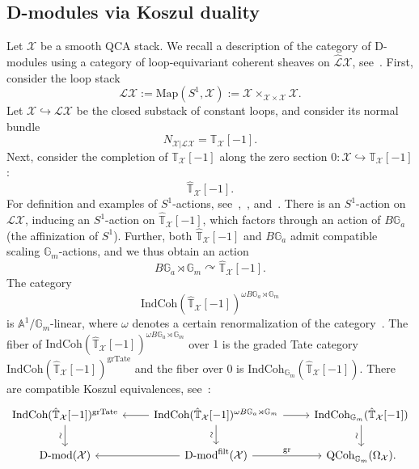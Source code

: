 \documentclass [11pt,oneside,a4paper,mathscr]{amsart}
\theoremstyle{definition}
\newcommand{\X}{\mathcal{X}}
\begin{document}
 
\subsection{D-modules via Koszul duality}

Let $\X$ be a smooth QCA stack. We recall a description of the category of D-modules using a category of loop-equivariant coherent sheaves on $\hat{\mathscr{L}}\X$, see~\cite[Theorem A]{HChen}. 
First, consider the loop stack \[\mathscr{L}\X:=\text{Map}(S^1,\X):=\X\times_{\X\times\X}\X.\]
Let $\X\hookrightarrow\mathscr{L}\X$ be the closed substack of constant loops, and consider its normal bundle
\[N_{\X|\mathscr{L}\X}=\mathbb{T}_{\X}[-1].\]
Next, consider the completion of $\mathbb{T}_\X[-1]$ along the zero section $0\colon \X\hookrightarrow \mathbb{T}_\X[-1]$: \[\hat{\mathbb{T}}_\X[-1].\] 
For definition and examples of $S^1$-actions, see~\cite{Preygel},~\cite{HChen}, and~\cite[Appendix A]{BZCHN}.
There is an $S^1$-action on $\mathscr{L}\X$, inducing an $S^1$-action on $\hat{\mathbb{T}}_\X[-1]$, which factors through an action of $B\mathbb{G}_a$ (the affinization of $S^1$). 
Further, both $\hat{\mathbb{T}}_\X[-1]$ and $B\mathbb{G}_a$ admit compatible scaling $\mathbb{G}_m$-actions, and we thus obtain an action  
\[B\mathbb{G}_a\rtimes \mathbb{G}_m \curvearrowright \hat{\mathbb{T}}_\X[-1].\] 
The category \[\text{IndCoh}(\hat{\mathbb{T}}_\X[-1])^{\omega B\mathbb{G}_a\rtimes\mathbb{G}_m}\] is $\mathbb{A}^1/\mathbb{G}_m$-linear, where $\omega$ denotes a certain renormalization of the category~\cite[Subsection 3.1.8]{HChen}. The fiber of $\text{IndCoh}(\hat{\mathbb{T}}_\X[-1])^{\omega B\mathbb{G}_a\rtimes\mathbb{G}_m}$ over $1$ is the graded Tate category $\text{IndCoh}(\hat{\mathbb{T}}_\X[-1])^{\text{grTate}}$ and the fiber over $0$ is $\text{IndCoh}_{\mathbb{G}_m}(\hat{\mathbb{T}}_\X[-1])$.
There are compatible Koszul equivalences, see~\cite[Theorem A]{HChen}:
\begin{equation*}
    \begin{tikzcd}
        \text{IndCoh}(\hat{\mathbb{T}}_\X[-1])^{\text{grTate}} 
        \arrow[d, "\sim" {anchor=south, rotate=90}]& 
        \text{IndCoh}(\hat{\mathbb{T}}_\X[-1])^{\omega B\mathbb{G}_a\rtimes\mathbb{G}_m} 
        \arrow[r]\arrow[l]\arrow[d, "\sim" {anchor=south, rotate=90}]& 
        \text{IndCoh}_{\mathbb{G}_m}(\hat{\mathbb{T}}_\X[-1]) \arrow[d, "\sim" {anchor=south, rotate=90}]\\
        \text{D-mod}(\X)& 
        \text{D-mod}^{\text{filt}}(\X) \arrow[r, "\text{gr}"]\arrow[l]& \text{QCoh}_{\mathbb{G}_m}(\Omega_{\X}).
    \end{tikzcd}
\end{equation*}
\end{document}
